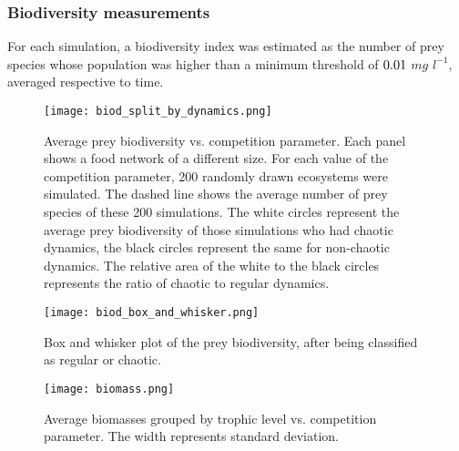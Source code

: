 \subsubsection{Biodiversity measurements}
\label{subsubsec:BiodiversityFigs}

For each simulation, a biodiversity index was estimated as the number of prey species whose population was higher than a minimum threshold of $0.01$ $mg$ $l^{-1}$, averaged respective to time.

\begin{figure}[H]
	\begin{center}
		\texttt{[image: biod\_split\_by\_dynamics.png]}
	\end{center}
	\caption{Average prey biodiversity vs. competition parameter. Each panel shows a food network of a different size. For each value of the competition parameter, 200 randomly drawn ecosystems were simulated. The dashed line shows the average number of prey species of these 200 simulations. The white circles represent the average prey biodiversity of those simulations who had chaotic dynamics, the black circles represent the same for non-chaotic dynamics. The relative area of the white to the black circles represents the ratio of chaotic to regular dynamics.}
	\label{fig:BiodSplitByChaos}
\end{figure}

\begin{figure}[H]
	\begin{center}
		\texttt{[image: biod\_box\_and\_whisker.png]}
	\end{center}
	\caption{Box and whisker plot of the prey biodiversity, after being classified as regular or chaotic.}
	\label{fig:BiodBoxAndWhisker}
\end{figure}

\begin{figure}[H]
	\begin{center}
		\texttt{[image: biomass.png]}
	\end{center}
	\caption{Average biomasses grouped by trophic level vs. competition parameter. The width represents standard deviation.}
	\label{fig:Biomass}
\end{figure}
